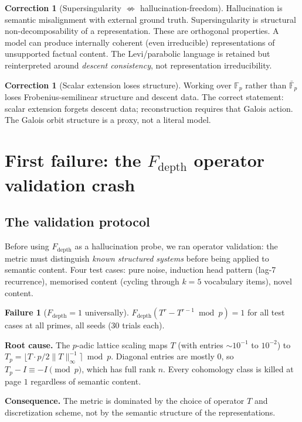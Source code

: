 \documentclass[11pt]{amsart}
\theoremstyle{definition}
\newtheorem{failure}[theorem]{Failure}
\newtheorem{correction}[theorem]{Correction}
\begin{document}
\begin{correction}[Supersingularity $\not\Leftrightarrow$ hallucination-freedom]
Hallucination is semantic misalignment with external ground truth.
Supersingularity is structural non-decomposability of a representation.
These are orthogonal properties.
A model can produce internally coherent (even irreducible) representations
of unsupported factual content.
The Levi/parabolic language is retained but reinterpreted around
\emph{descent consistency}, not representation irreducibility.
\end{correction}

\begin{correction}[Scalar extension loses structure]
Working over $\mathbb{F}_p$ rather than $\bar{\mathbb{F}}_p$ loses
Frobenius-semilinear structure and descent data.
The correct statement: scalar extension forgets descent data; reconstruction
requires that Galois action.
The Galois orbit structure is a proxy, not a literal model.
\end{correction}

\section{First failure: the $F_\mathrm{depth}$ operator validation crash}
\label{sec:fdepth-crash}

\subsection{The validation protocol}

Before using $F_\mathrm{depth}$ as a hallucination probe, we ran operator
validation: the metric must distinguish \emph{known structured systems}
before being applied to semantic content.
Four test cases: pure noise, induction head pattern (lag-7 recurrence),
memorised content (cycling through $k=5$ vocabulary items), novel content.

\begin{failure}[$F_\mathrm{depth} = 1$ universally]
\label{fail:fdepth}
$F_\mathrm{depth}(T^r - T^{r-1} \bmod p) = 1$ for all test cases at all
primes, all seeds (30 trials each).

\textbf{Root cause.} The $p$-adic lattice scaling maps $T$ (with entries
$\sim 10^{-1}$ to $10^{-2}$) to $T_p = \lfloor T \cdot p/2\|T\|_\infty^{-1} \rceil \bmod p$.
Diagonal entries are mostly $0$, so $T_p - I \equiv -I \pmod{p}$, which
has full rank $n$.
Every cohomology class is killed at page $1$ regardless of semantic content.

\textbf{Consequence.} The metric is dominated by the choice of operator $T$
and discretization scheme, not by the semantic structure of the representations.
\end{failure}
\end{document}
